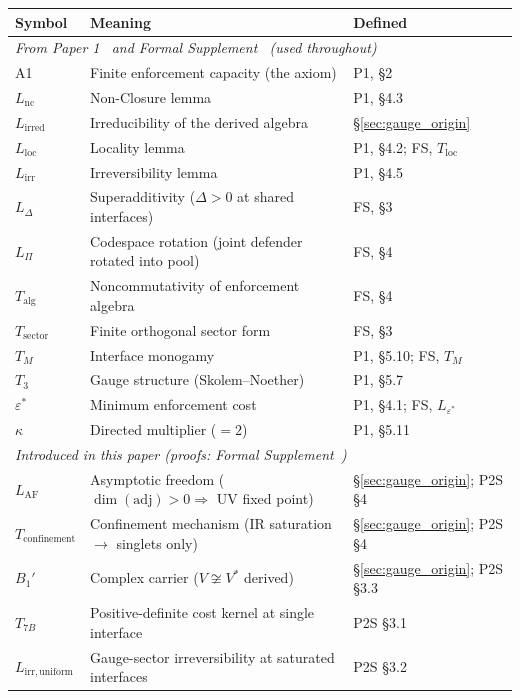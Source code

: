 \documentclass[11pt]{article}
\begin{document}
\begin{center}
\small
\begin{tabular}{lp{8.5cm}l}
\toprule
\textbf{Symbol} & \textbf{Meaning} & \textbf{Defined} \\
\midrule
\multicolumn{3}{l}{\textit{From Paper 1~\cite{BrookePaper1} and Formal Supplement~\cite{BrookeSupplement} (used throughout)}} \\[2pt]
A1 & Finite enforcement capacity (the axiom) & P1, \S2 \\
$L_{\mathrm{nc}}$ & Non-Closure lemma & P1, \S4.3 \\
$L_{\mathrm{irred}}$ & Irreducibility of the derived algebra & \S\ref{sec:gauge_origin} \\
$L_{\mathrm{loc}}$ & Locality lemma & P1, \S4.2; FS, $T_{\mathrm{loc}}$ \\
$L_{\mathrm{irr}}$ & Irreversibility lemma & P1, \S4.5 \\
$L_\Delta$ & Superadditivity ($\Delta > 0$ at shared interfaces) & FS, \S3 \\
$L_\Pi$ & Codespace rotation (joint defender rotated into pool) & FS, \S4 \\
$T_{\mathrm{alg}}$ & Noncommutativity of enforcement algebra & FS, \S4 \\
$T_{\mathrm{sector}}$ & Finite orthogonal sector form & FS, \S3 \\
$T_M$ & Interface monogamy & P1, \S5.10; FS, $T_M$ \\
$T_3$ & Gauge structure (Skolem--Noether) & P1, \S5.7 \\
$\varepsilon^*$ & Minimum enforcement cost & P1, \S4.1; FS, $L_{\varepsilon^*}$ \\
$\kappa$ & Directed multiplier ($= 2$) & P1, \S5.11 \\[4pt]
\multicolumn{3}{l}{\textit{Introduced in this paper (proofs: Formal Supplement~\cite{BrookeP2Supplement})}} \\[2pt]
$L_{\mathrm{AF}}$ & Asymptotic freedom ($\dim(\mathrm{adj}) > 0 \Rightarrow$ UV fixed point) & \S\ref{sec:gauge_origin}; P2S \S4 \\
$T_{\mathrm{confinement}}$ & Confinement mechanism (IR saturation $\to$ singlets only) & \S\ref{sec:gauge_origin}; P2S \S4 \\
$B_1'$ & Complex carrier ($V \not\cong V^*$ derived) & \S\ref{sec:gauge_origin}; P2S \S3.3 \\
$T_{7B}$ & Positive-definite cost kernel at single interface & P2S \S3.1 \\
$L_{\mathrm{irr,uniform}}$ & Gauge-sector irreversibility at saturated interfaces & P2S \S3.2 \\

\end{tabular}
\end{center}
\end{document}
